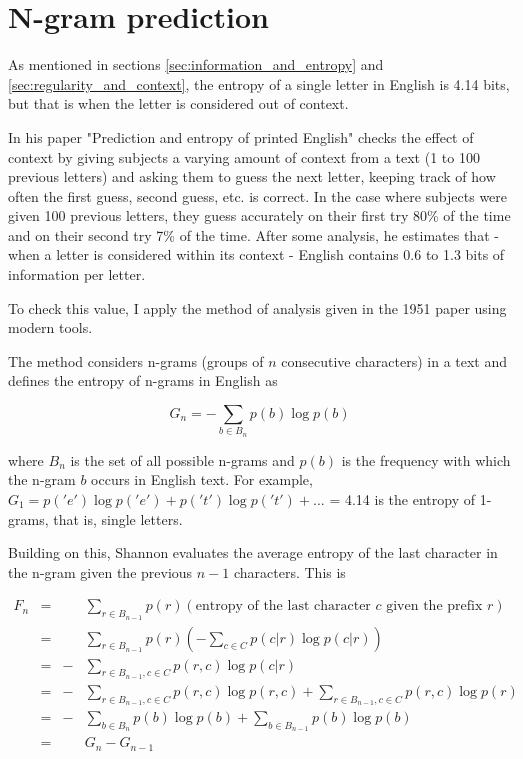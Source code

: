 \section{N-gram prediction}
\label{sec:n_gram}

As mentioned in sections \ref{sec:information_and_entropy} and \ref{sec:regularity_and_context}, the entropy of a single letter in English is 4.14 bits, but that is when the letter is considered out of context.

In his paper "Prediction and entropy of printed English" \textcite{Shannon1951} checks the effect of context by giving subjects a varying amount of context from a text (1 to 100 previous letters) and asking them to guess the next letter, keeping track of how often the first guess, second guess, etc. is correct. In the case where subjects were given 100 previous letters, they guess accurately on their first try 80\% of the time and on their second try 7\% of the time. After some analysis, he estimates that - when a letter is considered within its context - English contains 0.6 to 1.3 bits of information per letter.

To check this value, I apply the method of analysis given in the 1951 paper using modern tools.

The method considers n-grams (groups of $n$ consecutive characters) in a text and defines the entropy of n-grams in English as

$$G_n = -\sum_{b \in B_n} p(b) \log p(b)$$

where $B_n$ is the set of all possible n-grams and $p(b)$ is the frequency with which the n-gram $b$ occurs in English text. For example, $G_1 = p('e') \log p('e') + p('t') \log p('t') + ...$ = 4.14 is the entropy of 1-grams, that is, single letters.

Building on this, Shannon evaluates the average entropy of the last character in the n-gram given the previous $n-1$ characters. This is

\begin{align*}
F_n &= && \sum_{r \in B_{n-1}} p(r) (\text{entropy of the last character } c \text{ given the prefix } r) \\
&= && \sum_{r \in B_{n-1}} p(r) (-\sum_{c \in C} p(c|r) \log p(c|r)) \\
&= &- & \sum_{r \in B_{n-1},  c \in C} p(r,c) \log p(c|r) \\
&= &- & \sum_{r \in B_{n-1},  c \in C} p(r,c) \log p(r,c) +  \sum_{r \in B_{n-1},  c \in C} p(r,c) \log p(r) \\
&= &- & \sum_{b \in B_n} p(b) \log p(b) + \sum_{b \in B_{n-1}} p(b) \log p(b) \\
&= && G_n - G_{n-1} 
\end{align*}


